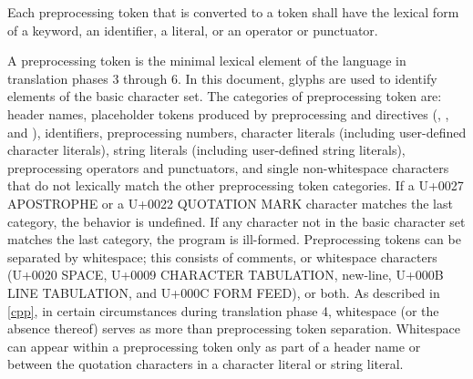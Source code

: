 \pnum
Each preprocessing token that is converted to a token
shall have the lexical form of a keyword, an identifier, a literal,
or an operator or punctuator.

\pnum
A preprocessing token is the minimal lexical element of the language in translation
phases 3 through 6.
In this document,
glyphs are used to identify
elements of the basic character set.
The categories of preprocessing token are: header names,
placeholder tokens produced by preprocessing  and  directives
(, , and ),
identifiers, preprocessing numbers, character literals (including user-defined character
literals), string literals (including user-defined string literals), preprocessing
operators and punctuators, and single non-whitespace characters that do not lexically
match the other preprocessing token categories.
If a U+0027 APOSTROPHE or a U+0022 QUOTATION MARK character
matches the last category, the behavior is undefined.
If any character not in the basic character set matches the last category,
the program is ill-formed.
Preprocessing tokens can be separated by
%
whitespace;
%
this consists of comments, or whitespace
characters (U+0020 SPACE, U+0009 CHARACTER TABULATION, new-line, U+000B LINE TABULATION, and U+000C FORM FEED), or both. As described in \ref{cpp}, in certain
circumstances during translation phase 4, whitespace (or the absence
thereof) serves as more than preprocessing token separation. Whitespace
can appear within a preprocessing token only as part of a header name or
between the quotation characters in a character literal or
string literal.

